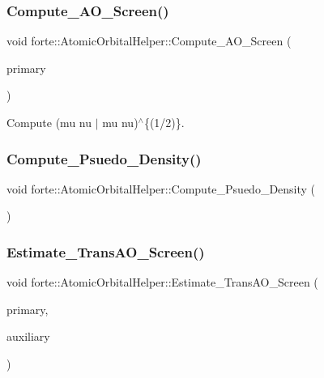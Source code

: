 \subsubsection{\texorpdfstring{Compute\+\_\+\+A\+O\+\_\+\+Screen()}{Compute\_AO\_Screen()}}
{\footnotesize\ttfamily void forte\+::\+Atomic\+Orbital\+Helper\+::\+Compute\+\_\+\+A\+O\+\_\+\+Screen (\begin{DoxyParamCaption}\item[{std\+::shared\+\_\+ptr$<$ psi\+::\+Basis\+Set $>$ \&}]{primary }\end{DoxyParamCaption})}



Compute (mu nu $\vert$ mu nu)$^\wedge$\{(1/2)\}. 

\mbox{\label{classforte_1_1_atomic_orbital_helper_aaf06be8bb2f953d576c5df623a4207cb}} 
\subsubsection{\texorpdfstring{Compute\+\_\+\+Psuedo\+\_\+\+Density()}{Compute\_Psuedo\_Density()}}
{\footnotesize\ttfamily void forte\+::\+Atomic\+Orbital\+Helper\+::\+Compute\+\_\+\+Psuedo\+\_\+\+Density (\begin{DoxyParamCaption}{ }\end{DoxyParamCaption})\hspace{0.3cm}{\ttfamily [protected]}}

\mbox{\label{classforte_1_1_atomic_orbital_helper_a19898dcd4ea53638b54ce7821982f900}} 
\subsubsection{\texorpdfstring{Estimate\+\_\+\+Trans\+A\+O\+\_\+\+Screen()}{Estimate\_TransAO\_Screen()}}
{\footnotesize\ttfamily void forte\+::\+Atomic\+Orbital\+Helper\+::\+Estimate\+\_\+\+Trans\+A\+O\+\_\+\+Screen (\begin{DoxyParamCaption}\item[{std\+::shared\+\_\+ptr$<$ psi\+::\+Basis\+Set $>$ \&}]{primary,  }\item[{std\+::shared\+\_\+ptr$<$ psi\+::\+Basis\+Set $>$ \&}]{auxiliary }\end{DoxyParamCaption})}


